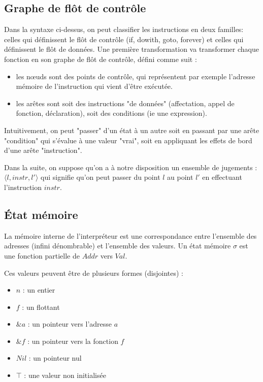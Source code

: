 \documentclass{article}
\begin{document}
\subsection{Graphe de flôt de contrôle}

Dans la syntaxe ci-dessus, on peut classifier les instructions en deux familles:
celles qui définissent le flôt de contrôle (if, dowith, goto, forever) et celles
qui définissent le flôt de données. Une première transformation va transformer
chaque fonction en son graphe de flôt de contrôle, défini comme suit :

\begin{itemize}
\item
  les nœuds sont des points de contrôle, qui représentent par exemple
  l'adresse mémoire de l'instruction qui vient d'être exécutée.
\item
  les arêtes sont soit des instructions "de données" (affectation,
  appel de fonction, déclaration), soit des conditions (ie une
  expression).
\end{itemize}

Intuitivement, on peut "passer" d'un état à un autre soit en passant par une
arête "condition" qui s'évalue à une valeur "vrai", soit en appliquant les
effets de bord d'une arête "instruction".

Dans la suite, on suppose qu'on a à notre disposition un ensemble de jugements :
$\langle l, instr, l' \rangle$ qui signifie qu'on peut passer du point $l$ au
point $l'$ en effectuant l'instruction $instr$.

\subsection{État mémoire}

La mémoire interne de l'interpréteur est une correspondance entre l'ensemble des
adresses (infini dénombrable) et l'ensemble des valeurs. Un état mémoire $σ$ est
une fonction partielle de $Addr$ vers $Val$.

Ces valeurs peuvent être de plusieurs formes (disjointes) :

\begin{itemize}
\item $n$ : un entier
\item $f$ : un flottant
\item $\&a$ : un pointeur vers l'adresse $a$
\item $\&f$ : un pointeur vers la fonction $f$
\item $Nil$ : un pointeur nul
\item $\top$ : une valeur non initialisée
\end{itemize}
\end{document}
